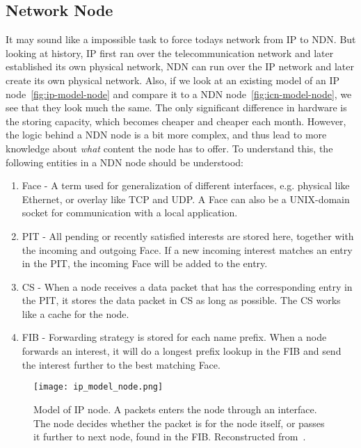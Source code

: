 \subsection{Network Node}
It may sound like a impossible task to force todays network from \gls{IP} to \gls{NDN}. 
But looking at history, \gls{IP} first ran over the telecommunication network and later established its own physical network, \gls{NDN} can run over the \gls{IP} network and later create its own physical network. 
Also, if we look at an existing model of an \gls{IP} node~\autoref{fig:ip-model-node} and compare it to a \gls{NDN} node~\autoref{fig:icn-model-node}, we see that they look much the same.
The only significant difference in hardware is the storing capacity, which becomes cheaper and cheaper each month.
However, the logic behind a \gls{NDN} \gls{node} is a bit more complex, and thus lead to more knowledge about \textit{what} content the node has to offer.
To understand this, the following entities in a \gls{NDN} \gls{node} should be understood:
\begin{enumerate}\label{ndn-node-modules}
  \item Face - A term used for generalization of different interfaces, e.g. physical like Ethernet, or overlay like \gls{TCP} and \gls{UDP}. A Face can also be a UNIX-domain socket for communication with a local application.
  \item \gls{PIT} - All pending or recently satisfied \gls{interest}s are stored here, together with the incoming and outgoing Face.
  If a new incoming \gls{interest} matches an entry in the \gls{PIT}, the incoming Face will be added to the entry. 
  \item \gls{CS} - When a \gls{node} receives a \gls{data} packet that has the corresponding entry in the \gls{PIT}, it stores the \gls{data} packet in \gls{CS} as long as possible. 
  The \gls{CS} works like a cache for the \gls{node}.
  \item \gls{FIB} - Forwarding strategy is stored for each \gls{name} prefix. 
  When a \gls{node} forwards an \gls{interest}, it will do a longest prefix lookup in the \gls{FIB} and send the \gls{interest} further to the best matching Face.
\end{enumerate}

\begin{figure}[H]
  \centering
  \texttt{[image: ip\_model\_node.png]}
  \caption[Model of IP node]{Model of IP node. A packets enters the node through an interface. 
  The node decides whether the packet is for the node itself, or passes it further to next node, found in the FIB.
  Reconstructed from~\cite{jac09-03}.}
  \label{fig:ip-model-node}
\end{figure}

